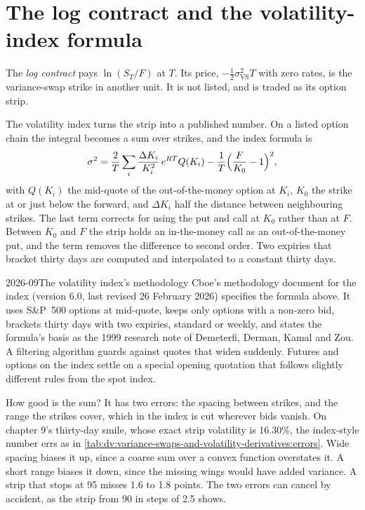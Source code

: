 \section{The log contract and the volatility-index formula}

\begin{definition}\label{def:dv:variance-swaps-and-volatility-derivatives:log}
The \emph{log contract} pays $\ln(S_T/F)$ at $T$. Its price, $-\frac12\sigma_{\mathrm{VS}}^2T$
with zero rates, is the variance-swap strike in another unit. It is not listed, and is traded as its option
strip.
\end{definition}

The volatility index turns the strip into a published number. On a listed option chain the integral becomes a
sum over strikes, and the index formula is
\[
\sigma^2=\frac2T\sum_i\frac{\Delta K_i}{K_i^2}\,e^{RT}Q(K_i)-\frac1T\Bigl(\frac F{K_0}-1\Bigr)^2,
\]
with $Q(K_i)$ the mid-quote of the out-of-the-money option at $K_i$, $K_0$ the strike at or just below the
forward, and $\Delta K_i$ half the distance between neighbouring strikes. The last term corrects for using
the put and call at $K_0$ rather than at $F$. Between $K_0$ and $F$ the strip holds an in-the-money call as an
out-of-the-money put, and the term removes the difference to second order. Two expiries that bracket thirty
days are computed and interpolated to a constant thirty days.

\begin{dated}{2026-09}{The volatility index's methodology}\label{dat:dv:variance-swaps-and-volatility-derivatives:vix}
Cboe's methodology document for the index (version 6.0, last revised 26 February 2026) specifies the formula above.
It uses S\&P~500 options at mid-quote, keeps only options with a non-zero bid, brackets thirty days with two
expiries, standard or weekly, and states the formula's basis as the 1999 research note of Demeterfi, Derman,
Kamal and Zou. A filtering algorithm guards against quotes that widen suddenly. Futures and options on the
index settle on a special opening quotation that follows slightly different rules from the spot index.
\end{dated}

How good is the sum? It has two errors: the spacing between strikes, and the range the strikes cover, which in
the index is cut wherever bids vanish. On chapter 9's thirty-day smile, whose exact strip volatility is 16.30\%,
the index-style number errs as in \cref{tab:dv:variance-swaps-and-volatility-derivatives:errors}. Wide spacing
biases it up, since a coarse sum over a convex function overstates it. A short range biases it down, since the
missing wings would have added variance. A strip that stops at 95 misses 1.6 to 1.8 points. The two errors can
cancel by accident, as the strip from 90 in steps of 2.5 shows.

